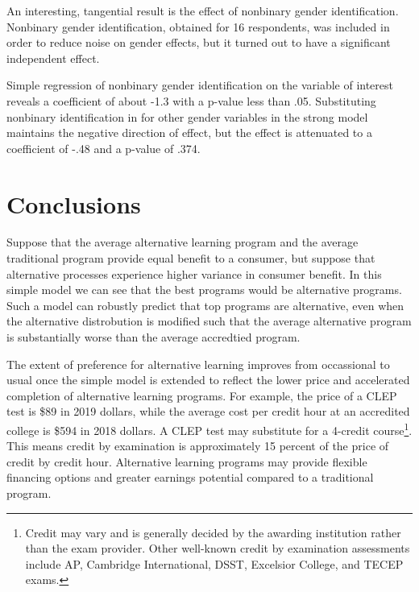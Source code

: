 \documentclass[AER]{./aea-latex-templates/AEA}
\begin{document}
        An interesting, tangential result is the effect of nonbinary gender identification.
        Nonbinary gender identification, obtained for 16 respondents, was included in order to
        reduce noise on gender effects, but it turned out to have a significant independent effect.
        
        Simple regression of nonbinary gender identification on the variable of
        interest reveals a coefficient of about -1.3 with a p-value less than .05.
        Substituting nonbinary identification in for other gender variables in the strong model
        maintains the negative direction of effect, but the effect is
        attenuated to a coefficient of -.48 and a p-value of .374.
        
        \section{Conclusions}
        
        Suppose that the average alternative learning program and the average traditional program
        provide equal benefit to a consumer, but suppose that alternative
        processes experience higher variance in consumer benefit. In this
        simple model we can see that the best programs would be alternative
        programs. Such a model can robustly predict that top programs are
        alternative, even when the alternative distrobution is modified such
        that the average alternative program is substantially worse than the
        average accredtied program.
        
        The extent of preference for alternative learning improves from
        occassional to usual once the simple model is extended to reflect the
        lower price and accelerated completion of alternative learning programs.
        For example, the price of a CLEP test is \$89 in 2019 dollars\cite{collegeboard_2019}, while
        the average cost per credit hour at an accredited college is \$594 in 2018
        dollars\cite{kirkham2018study}. A CLEP test may substitute for a 4-credit course\footnote{Credit
        may vary and is generally decided by the awarding institution rather than
        the exam provider. Other well-known credit by examination assessments include AP, Cambridge International, DSST, Excelsior
        College, and TECEP exams.}. This means credit by examination is approximately 15 percent of the price of credit by credit hour.
        Alternative learning programs may provide flexible financing options and greater earnings potential compared to a traditional program.
        
\end{document}
